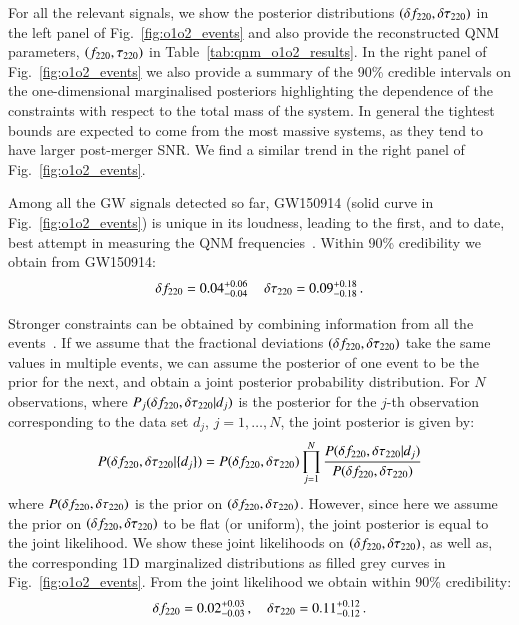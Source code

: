For all the relevant signals, we show the posterior distributions $(\delta f_{\text{220}}, \delta \tau_{\text{220}})$ in the left panel of Fig.~\ref{fig:o1o2_events} and also provide the reconstructed QNM parameters, $(f_{\text{220}}, \tau_{\text{220}})$ in Table~\ref{tab:qnm_o1o2_results}. In the right panel  of Fig.~\ref{fig:o1o2_events} we also provide a summary of the 90\% credible intervals on the one-dimensional marginalised posteriors highlighting the dependence of the constraints with respect to the total mass of the system. In general the tightest bounds are expected to come from the most massive systems, as they tend to have larger post-merger SNR. We find a similar trend in the right panel of Fig.~\ref{fig:o1o2_events}.
 
Among all the GW signals detected so far, GW150914 (solid curve in Fig.~\ref{fig:o1o2_events}) is unique in its loudness, leading to the first, and to date, best attempt in measuring the QNM frequencies~\cite{TheLIGOScientific:2016src,Brito:2018rfr,Carullo:2019flw,Isi:2019aib}. Within 90\% credibility we obtain from GW150914: 
%
\begin{equation}
\delta f_{\text{220}}=0.04^{+0.06}_{-0.04}\,\quad \delta \tau_{\text{220}}=0.09^{+0.18}_{-0.18}\,.
\end{equation}

Stronger constraints can be obtained by combining information from all the events~\cite{Abbott:2020jks}. If we assume that the fractional deviations $(\delta f_{\text{220}},\delta \tau_{\text{220}})$ take the same values in multiple events, we can assume
the posterior of one event to be the prior for the next, and obtain a
joint posterior probability distribution. For $N$ observations, where
$P_j(\delta f_{\text{220}}, \delta \tau_{\text{220}} | d_j)$ is the posterior for the $j$-th
observation corresponding to the data set $d_j$, $j=1,\dots,N$, the joint
posterior is given by:
%
\begin{equation}
P(\delta f_{\text{220}}, \delta \tau_{\text{220}} | \{d_j\}) = P(\delta f_{\text{220}}, \delta \tau_{\text{220}}) \prod _{j=1}^N \frac{P(\delta f_{\text{220}}, \delta \tau_{\text{220}} | d_j) }{P(\delta f_{\text{220}}, \delta \tau_{\text{220}})}
\end{equation}
%
where $P(\delta f_{\text{220}}, \delta \tau_{\text{220}})$ is the prior on $(\delta f_{\text{220}},
\delta \tau_{\text{220}})$. However, since here we assume the prior on $(\delta f_{\text{220}},
\delta \tau_{\text{220}})$ to be flat (or uniform), the joint posterior is equal to
the joint likelihood. We show these joint likelihoods on $(\delta f_{\text{220}}, \delta \tau_{\text{220}})$, as well as, the corresponding 1D marginalized distributions as filled grey curves in Fig.~\ref{fig:o1o2_events}. From the joint likelihood we obtain within 90\% credibility: 
%
\begin{equation}
\delta f_{\text{220}}=0.02^{+0.03}_{-0.03}\,,\quad \delta \tau_{\text{220}}=0.11^{+0.12}_{-0.12}\,.
\end{equation}
%


